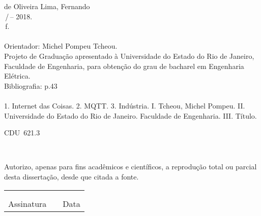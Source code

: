 \begin{titlepage}
\begin{center}
\begin{boxedminipage}{140mm}
{\begin{minipage}[top]{115mm}
		de Oliveira Lima, Fernando\\
		\phantom{XX}\setTitulo\,/\,\setNomeAluno -- 2018.\\
		\phantom{XX}\pageref{LastPage}\,f.\\
		\phantom{XX}\\
		\phantom{XX}Orientador: Michel Pompeu Tcheou.\\
       		\phantom{XX}Projeto de Graduação apresentado à Universidade do Estado do Rio de Janeiro, Faculdade de Engenharia, para obtenção do grau de bacharel em Engenharia Elétrica.\\
		\phantom{XX} Bibliografia: p.43\\
		\phantom{XX} \\
		\phantom{XX}  1. Internet das Coisas. 2. MQTT. 3. Indústria. I. Tcheou, Michel Pompeu. II. Universidade do Estado do Rio de Janeiro. Faculdade de Engenharia. III. Título.
	\end{minipage}}
	\vspace*{5mm}
	\begin{flushright}
	 CDU~621.3
	\end{flushright}
    \vspace{1mm}
	\end{boxedminipage}\\
	\end{center}
%
	Autorizo, apenas para fins acadêmicos e científicos, a reprodução total ou parcial desta dissertação, desde que citada a fonte.\\
	\noindent
	\begin{tabular}{ccc}
	\phantom{XXXXXXXXXXXXXXXXXXXXXXXXXXXXXX}&	 \phantom{XX}	&	\phantom{XXXXXXXXXXXXXXXX}	\\
	\phantom{XXXXXXXXXXXXXXXXXXXXXXXXXXXXXX}&	 \phantom{XX}	&	\phantom{XXXXXXXXXXXXXXXX}	\\
	\cline{1-1}\cline{3-3}
	Assinatura &		&	Data
	\end{tabular}
\end{titlepage} 